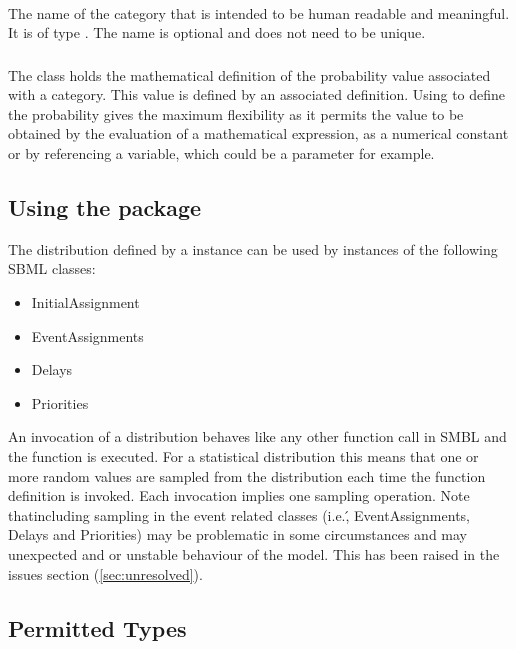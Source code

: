 \documentclass[draftspec]{sbmlpkgspec}
\begin{document}
\paragraph{}

The name of the category that is intended to be human readable and
meaningful. It is of type . The name is optional and does
not need to be unique.

\subsubsection{}

The  class holds the mathematical definition of the
probability value associated with a category. This value is defined by
an associated \mathml definition. Using \mathml to define the
probability gives the maximum flexibility as it permits the value to
be obtained by the evaluation of a mathematical expression, as a
numerical constant or by referencing a variable, which could be a
parameter for example.

\subsection{Using the \distribshort package}

The distribution defined by a \FunctionDefinition instance can be
used by instances of the following SBML classes:

\begin{itemize}
  \item InitialAssignment
  \item EventAssignments
  \item Delays
  \item Priorities
\end{itemize}

An invocation of a distribution behaves like any other function call
in SMBL and the function is executed. For a statistical distribution
this means that one or more random values are sampled from the distribution
each time the function definition is invoked. Each invocation implies
one sampling operation. Note that\contraversial including sampling in
the event related classes (i.e.\', EventAssignments, Delays and
Priorities) may be problematic in some circumstances and may
unexpected and or unstable behaviour of the model. This has been
raised in the issues section (\ref{sec:unresolved}).

\subsection{Permitted Types}
\end{document}

